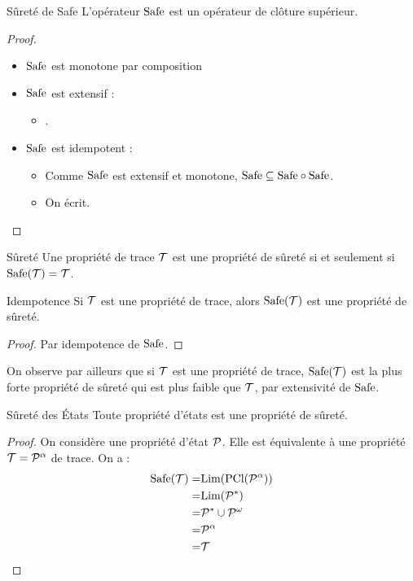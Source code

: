 \documentclass{cours}
\begin{document}
\begin{propositionfr}{Sûreté de {\rm Safe}}{}
    L'opérateur $\rm Safe$ est un opérateur de clôture supérieur.
\end{propositionfr}
\begin{proof}
    \begin{itemize}
        \item ${\rm Safe}$ est monotone par composition
        \item $\rm Safe$ est extensif : 
        \begin{itemize}
            \item .
        \end{itemize}
        \item $\rm Safe$ est idempotent : 
        \begin{itemize}
            \item Comme $\rm Safe$ est extensif et monotone, $\rm Safe \subseteq Safe \circ Safe$.
            \item On écrit.
        \end{itemize}
    \end{itemize}
\end{proof}
\begin{définition}{Sûreté}{}
    Une propriété de trace $\mathcal{T}$ est une propriété de sûreté si et seulement si ${\rm Safe}(\mathcal{T}) = \mathcal{T}$. 
\end{définition}
\begin{théorème}{Idempotence}{}
    Si $\mathcal{T}$ est une propriété de trace, alors $\mathrm{Safe}(\mathcal{T})$ est une propriété de sûreté.
\end{théorème}
\begin{proof}
    Par idempotence de $\rm Safe$.
\end{proof}
On observe par ailleurs que si $\mathcal{T}$ est une propriété de trace, $\mathrm{Safe}(\mathcal{T})$ est la plus forte propriété de sûreté qui est plus faible que $\mathcal{T}$, par extensivité de $\rm Safe$.

\begin{théorème}{Sûreté des États}{}
    Toute propriété d'états est une propriété de sûreté.
\end{théorème}
\begin{proof}
    On considère une propriété d'état $\mathcal{P}$. Elle est équivalente à une propriété $\mathcal{T} = \mathcal{P}^{\alpha}$ de trace. On a : 
    \[
        \begin{aligned}
            \rm Safe(\mathcal{T}) =&\rm Lim(PCl(\mathcal{P}^{\alpha}))\\
            =& \rm Lim (\mathcal{P}^{*})\\
            =& \mathcal{P}^{*} \cup \mathcal{P}^{\omega}\\
            =& \mathcal{P}^{\alpha}\\
            =& \mathcal{T}
        \end{aligned}
    \]
\end{proof}
\end{document}
